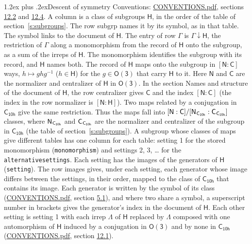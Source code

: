 \documentclass[10pt,a4paper]{article}
\makeatletter
\renewcommand\section{\@startsection{section}{1}{\z@}{-3ex plus -1ex minus -.2ex}%
  {1.2ex plus .2ex}{\normalfont\large\sffamily\bfseries\color{parttitle}}}
\numberwithin{equation}{section}
\newcommand{\grp}[1]{\mathsf{#1}}
\newcommand{\grpindex}[2]{[#1 : #2]}
\newcommand{\restr}[2]{#1\!\downarrow#2}
\newcommand{\hairsp}{\mkern1mu}
\makeatother
\begin{document}
\section{Descent of symmetry}\label{s:subduction}
Conventions: \href{../../CONVENTIONS.pdf}{CONVENTIONS.pdf}, sections \href{../../CONVENTIONS.pdf\#conv.12.2}{12.2} and \href{../../CONVENTIONS.pdf\#conv.12.4}{12.4}.
A column is a class of subgroups $\grp{H}$, in the order of the table of section~\ref{s:subgroups}. The row subgrp names it by its symbol, as in that table. The symbol links to the document of $\grp{H}$. The entry of row $\Gamma$ is $\restr{\Gamma}{\grp{H}}$, the restriction of $\Gamma$ along a monomorphism from the record of $\grp{H}$ onto the subgroup, as a sum of the irreps of $\grp{H}$. The monomorphism identifies the subgroup with its record, and $\grp{H}$ names both. \label{n:group.normalizer.o3}\label{n:group.centralizer.o3}The record of $\grp{H}$ maps onto the subgroup in $\grpindex{\grp{N}}{\grp{C}}$ ways, $h \mapsto g h g^{-1}$ ($h \in \grp{H}$) for the $g \in \grp{O(3)}$ that carry $\grp{H}$ to it. Here $\grp{N}$ and $\grp{C}$ are the normalizer and centralizer of $\grp{H}$ in \href{O3.pdf}{$\grp{O(3)}$}. In the section Names and structure of the document of $\grp{H}$, the row centralizer gives $\grp{C}$ and the index $\grpindex{\grp{N}}{\grp{C}}$ (the index in the row normalizer is $\grpindex{\grp{N}}{\grp{H}}$). Two maps related by a conjugation in $\grp{C_{10h}}$ give the same restriction. Thus the maps fall into $\grpindex{\grp{N}}{\grp{C}}/\grpindex{\grp{N}_{\hairsp \grp{C_{10h}}}}{\grp{C}_{\hairsp \grp{C_{10h}}}}$ classes, where $\grp{N}_{\hairsp \grp{C_{10h}}}$ and $\grp{C}_{\hairsp \grp{C_{10h}}}$ are the normalizer and centralizer of the subgroup in $\grp{C_{10h}}$ (the table of section~\ref{s:subgroups}). \label{n:head.setting}A subgroup whose classes of maps give different tables has one column for each table: setting 1 for the stored monomorphism (\texttt{monomorphism}) and settings 2, 3, \dots{} for the \texttt{alternativesettings}. Each setting has the images of the generators of $\grp{H}$ (\texttt{setting}). \label{n:head.images}The row images gives, under each setting, each generator whose image differs between the settings, in their order, mapped to the class of $\grp{C_{10h}}$ that contains its image. Each generator is written by the symbol of its class (\href{../../CONVENTIONS.pdf}{CONVENTIONS.pdf}, section \href{../../CONVENTIONS.pdf\#conv.5.1}{5.1}), and where two share a symbol, a superscript number in brackets gives the generator's index in the document of $\grp{H}$. \label{n:irrep.Delta}Each other setting is setting 1 with each irrep $\Lambda$ of $\grp{H}$ replaced by $\Lambda$ composed with one automorphism of $\grp{H}$ induced by a conjugation in \href{O3.pdf}{$\grp{O(3)}$} and by none in $\grp{C_{10h}}$ (\href{../../CONVENTIONS.pdf}{CONVENTIONS.pdf}, section \href{../../CONVENTIONS.pdf\#conv.12.1}{12.1}).
\end{document}
